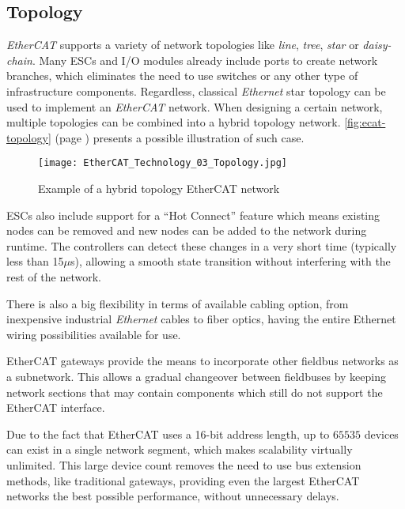 \subsection{Topology} \label{subsec:ecat-topology}

\emph{EtherCAT} supports a variety of network topologies like \emph{line}, \emph{tree}, \emph{star} or \emph{daisy-chain}.
Many ESCs and I/O modules already include ports to create network branches, which eliminates the need to use switches or any other type of infrastructure components.
Regardless, classical \emph{Ethernet} star topology can be used to implement an \emph{EtherCAT} network.
When designing a certain network, multiple topologies can be combined into a hybrid topology network.
\autoref{fig:ecat-topology} (page \pageref{fig:ecat-topology}) presents a possible illustration of such case.

\begin{figure}[htp]
	\centering
	\texttt{[image: EtherCAT\_Technology\_03\_Topology.jpg]}
	\caption{Example of a hybrid topology EtherCAT network \cite{protocol:ethercat}}
	\label{fig:ecat-topology}
\end{figure}

ESCs also include support for a ``Hot Connect'' feature which means existing nodes can be removed and new nodes can be added to the network during runtime.
The controllers can detect these changes in a very short time (typically less than 15$\mu$s), allowing a smooth state transition without interfering with the rest of the network.

There is also a big flexibility in terms of available cabling option, from inexpensive industrial \emph{Ethernet} cables to fiber optics, having the entire Ethernet wiring possibilities available for use.

EtherCAT gateways provide the means to incorporate other fieldbus networks as a subnetwork.
This allows a gradual changeover between fieldbuses by keeping network sections that may contain components which still do not support the EtherCAT interface.

Due to the fact that EtherCAT uses a 16-bit address length, up to $65535$ devices can exist in a single network segment, which makes scalability virtually unlimited.
This large device count removes the need to use bus extension methods, like traditional gateways, providing even the largest EtherCAT networks the best possible performance, without unnecessary delays.
